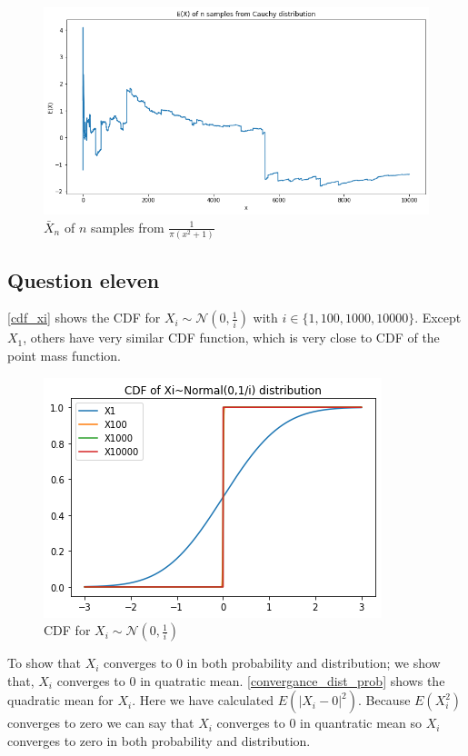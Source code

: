 \documentclass[12pt, a4paper]{book}
\begin{document}
\begin{figure}[h]
    \centering
    \includegraphics[width=0.8\linewidth]{images/question10/cauchy.png}
    \caption{$\bar{X}_n$ of $n$ samples from $\frac{1}{\pi(x^2+1)}$}
    \label{e_x_bar_cauchy}
\end{figure}

\clearpage

\subsection*{Question eleven}

\autoref{cdf_xi} shows the CDF for $X_i \sim \mathcal{N}(0,\frac{1}{i})$ with $i \in \{1, 100, 1000, 10000\}$.
Except $X_1$, others have very similar CDF function, which is very close to CDF of the point mass function.

\begin{figure}[h]
    \centering
    \includegraphics[width=0.5\linewidth]{images/question11/cdf.png}
    \caption{CDF for $X_i \sim \mathcal{N}(0,\frac{1}{i})$}
    \label{cdf_xi}
\end{figure}

To show that $X_i$ converges to $0$ in both probability and distribution; we show that,
$X_i$ converges to $0$ in quatratic mean. \autoref{convergance_dist_prob} shows the quadratic mean
for $X_i$. Here we have calculated $E(|X_i-0|^2)$. Because $E(X_i^2)$ converges to zero we can say
that $X_i$ converges to 0 in quantratic mean so $X_i$ converges to zero in both probability and
distribution.
\end{document}
